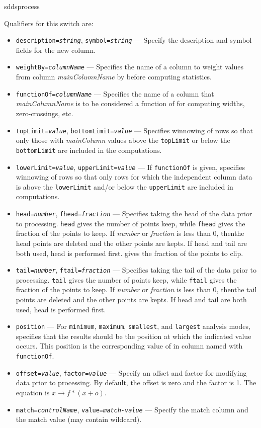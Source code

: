 \begin{sddsprog}{sddsprocess}
\begin{itemize}
\begin{itemize}
Qualifiers for this switch are:
\begin{itemize}
\item {\tt description={\em string}}, {\tt symbol={\em string}} --- Specify the description and symbol
fields for the new column.
\item {\tt weightBy={\em columnName}} --- Specifies the name of a column to weight values from 
column {\em mainColumnName} by before computing statistics.
\item {\tt functionOf={\em columnName}} --- Specifies the name of a column that {\em mainColumnName}
is to be considered a function of for computing widths, zero-crossings, etc.
\item {\tt topLimit={\em value}}, {\tt bottomLimit={\em value}} --- Specifies winnowing of rows
so that only those with {\em mainColumn} values above the {\tt topLimit} or below the {\tt bottomLimit} are 
included in the computations.
\item {\tt lowerLimit={\em value}}, {\tt upperLimit={\em value}} --- If {\tt functionOf} is given,
specifies winnowing of rows so that only rows for which the independent column data is above
the {\tt lowerLimit} and/or below the {\tt upperLimit} are included in computations.
\item {\tt head={\em number}}, {\tt fhead={\em fraction}} --- Specifies taking the head 
of the data prior to processing.  {\tt head} gives the number of points keep, while {\tt fhead}
gives the fraction of the points to keep.  If {\em number} or {\em fraction} is less than 0, thenthe head points are deleted and the other points are kepts. If head and tail are both used, head  is
performed first.
gives the fraction of the points to clip.
\item {\tt tail={\em number}}, {\tt ftail={\em fraction}} --- Specifies taking the tail 
of the data prior to processing.  {\tt tail} gives the number of points keep, while {\tt ftail}
gives the fraction of the points to keep.  If {\em number} or {\em fraction} is less than 0, thenthe tail points are deleted and the other points are kepts. If head and tail are both used, head  is
performed first.
\item {\tt position} --- For {\tt minimum}, {\tt maximum}, {\tt smallest}, and {\tt largest} analysis modes,
specifies that the results should be the position at which the indicated value occurs.  This position is
the corresponding value of in column named with {\tt functionOf}.
\item {\tt offset={\em value}}, {\tt factor={\em value}} --- Specify an offset and factor for modifying
data prior to processing.  By default, the offset is zero and the factor is 1.  The equation is
$x \rightarrow f*(x+o) $.
\item {\tt match={\em controlName}}, {\tt value={\em match-value}} --- Specify the match column and the
match value (may contain wildcard).
\end{itemize}



\end{itemize}
\end{itemize}
\end{sddsprog}
